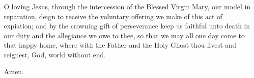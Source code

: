 \begin{enpars}
\lettrine{O}{} loving Jesus, through the intercession of the Blessed Virgin Mary, our model in
reparation, deign to receive the voluntary offering we make of this act of expiation;
and by the crowning gift of perseverance keep us faithful unto death in our duty and
the allegiance we owe to thee, so that we may all one day come to that happy home,
where with the Father and the Holy Ghost thou livest and reignest, God, world without
end.

\rr Amen.

\end{enpars}